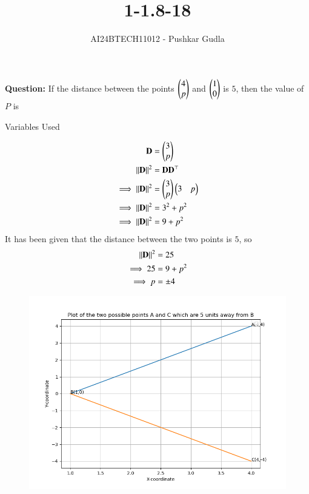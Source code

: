 \documentclass[journal]{IEEEtran}
\begin{document}

\vspace{3cm}

\title{1-1.8-18}
\author{AI24BTECH11012 - Pushkar Gudla}
{\let\newpage\relax\maketitle}

\renewcommand{\thefigure}{\theenumi}
\renewcommand{\thetable}{\theenumi}
\setlength{\intextsep}{10pt} %


\renewcommand{\thetable}{\theenumi}
\textbf{Question:} If the distance between the points $\begin{pmatrix}4\\p\end{pmatrix}$ and $\begin{pmatrix}1\\0\end{pmatrix}$ is $5$, then the value of $P$ is
\solution
\begin{table}[h!]    
  \centering
  
  \caption{Variables Used}
  \label{tab10.5.3.9.1}
\end{table}
\begin{align}
	\mathbf{D}	&= \begin{pmatrix}3\\p\end{pmatrix} \\
	\left\lVert\mathbf{D}\right\rVert^2 &= \mathbf{D}\mathbf{D}^\top \\
	\implies \left\lVert\mathbf{D}\right\rVert^2 &= \begin{pmatrix}3\\p\end{pmatrix}\begin{pmatrix}3 & p\end{pmatrix} \\
	\implies \left\lVert\mathbf{D}\right\rVert^2 &= 3^2 + p^2 \\
	\implies \left\lVert\mathbf{D}\right\rVert^2 &= 9 + p^2 \\
\end{align}
It has been given that the distance between the two points is $5$, so \\
\begin{align}
	\left\lVert\mathbf{D}\right\rVert^2 &= 25 \\
	\implies 25 &= 9 + p^2 \\
	\implies p &= \pm 4
\end{align}
\begin{figure}[h]
	\centering
	\includegraphics[scale=0.6]{figs/plot.png}
	\label{Fig}
\end{figure}
\end{document}
